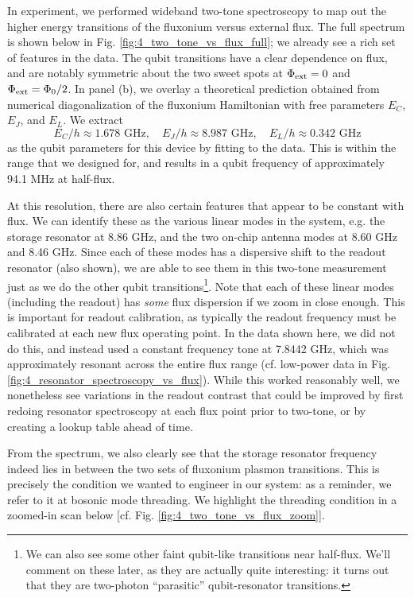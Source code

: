 In experiment, we performed wideband two-tone spectroscopy to map out the higher energy transitions of the fluxonium versus external flux. The full spectrum is shown below in Fig. \ref{fig:4_two_tone_vs_flux_full}; we already see a rich set of features in the data. The qubit transitions have a clear dependence on flux, and are notably symmetric about the two sweet spots at $\Phi_{\rm ext} = 0$ and $\Phi_{\rm ext} = \Phi_0/2$. In panel (b), we overlay a theoretical prediction obtained from numerical diagonalization of the fluxonium Hamiltonian with free parameters $E_C$, $E_J$, and $E_L$. We extract
\begin{equation}
    E_C/h \approx 1.678 \,\, \text{GHz}, \quad  E_J/h \approx 8.987 \,\, \text{GHz}, \quad  E_L/h \approx 0.342 \,\, \text{GHz} 
    \label{eq:4_qubit_parameters_fit}
\end{equation}
as the qubit parameters for this device by fitting to the data. This is within the range that we designed for, and results in a qubit frequency of approximately 94.1 MHz at half-flux. 

At this resolution, there are also certain features that appear to be constant with flux. We can identify these as the various linear modes in the system, e.g. the storage resonator at 8.86 GHz, and the two on-chip antenna modes at 8.60 GHz and 8.46 GHz. Since each of these modes has a dispersive shift to the readout resonator (also shown), we are able to see them in this two-tone measurement just as we do the other qubit transitions\footnote{We can also see some other faint qubit-like transitions near half-flux. We'll comment on these later, as they are actually quite interesting: it turns out that they are two-photon ``parasitic'' qubit-resonator transitions.}. Note that each of these linear modes (including the readout) has \textit{some} flux dispersion if we zoom in close enough. This is important for readout calibration, as typically the readout frequency must be calibrated at each new flux operating point. In the data shown here, we did not do this, and instead used a constant frequency tone at 7.8442 GHz, which was approximately resonant across the entire flux range (cf. low-power data in Fig. \ref{fig:4_resonator_spectroscopy_vs_flux}). While this worked reasonably well, we nonetheless see variations in the readout contrast that could be improved by first redoing resonator spectroscopy at each flux point prior to two-tone, or by creating a lookup table ahead of time. 

From the spectrum, we also clearly see that the storage resonator frequency indeed lies in between the two sets of fluxonium plasmon transitions. This is precisely the condition we wanted to engineer in our system: as a reminder, we refer to it at bosonic mode threading. We highlight the threading condition in a zoomed-in scan below [cf. Fig. \ref{fig:4_two_tone_vs_flux_zoom}]. 

